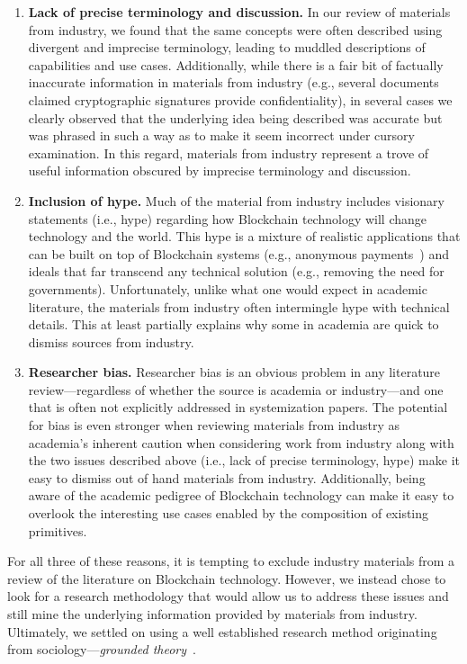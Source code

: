 \begin{enumerate}
	\item \textbf{Lack of precise terminology and discussion.}
	In our review of materials from industry, we found that the same concepts were often described using divergent and imprecise terminology, leading to muddled descriptions of capabilities and use cases.
	Additionally, while there is a fair bit of factually inaccurate information in materials from industry (e.g., several documents claimed cryptographic signatures provide confidentiality), in several cases we clearly observed that the underlying idea being described was accurate but was phrased in such a way as to make it seem incorrect under cursory examination.
	In this regard, materials from industry represent a trove of useful information obscured by imprecise terminology and discussion.
	
	\item \textbf{Inclusion of hype.}
	Much of the material from industry includes visionary statements (i.e., hype) regarding how Blockchain technology will change technology and the world.
	This hype is a mixture of realistic applications that can be built on top of Blockchain systems (e.g., anonymous payments~\cite{tbd}) and ideals that far transcend any technical solution (e.g., removing the need for governments).
	Unfortunately, unlike what one would expect in academic literature, the materials from industry often intermingle hype with technical details. This at least partially explains why some in academia are quick to dismiss sources from industry.
	
	\item \textbf{Researcher bias.}	
	Researcher bias is an obvious problem in any literature review---regardless of whether the source is academia or industry---and one that is often not explicitly addressed in systemization papers.
	The potential for bias is even stronger when reviewing materials from industry as academia's inherent caution when considering work from industry along with the two issues described above (i.e., lack of precise terminology, hype) make it easy to dismiss out of hand materials from industry.
	Additionally, being aware of the academic pedigree of Blockchain technology can make it easy to overlook the interesting use cases enabled by the composition of existing primitives.
	
\end{enumerate}

For all three of these reasons, it is tempting to exclude industry materials from a review of the literature on Blockchain technology.
However, we instead chose to look for a research methodology that would allow us to address these issues and still mine the underlying information provided by materials from industry.
Ultimately, we settled on using a well established research method originating from sociology---\emph{grounded theory}~\cite{groundedTheory}.

